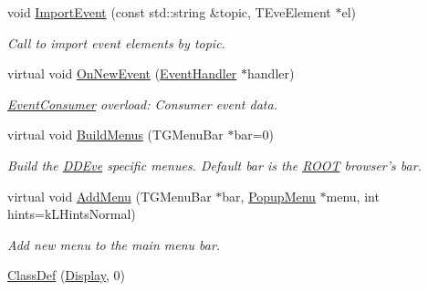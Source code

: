 \begin{DoxyCompactItemize}
void \hyperlink{class_d_d4hep_1_1_display_a4e4468f23cce5076fbd862bc414742c3}{ImportEvent} (const std::string \&topic, TEveElement $\ast$el)
\begin{DoxyCompactList}\small\item\em Call to import event elements by topic. \item\end{DoxyCompactList}\item 
virtual void \hyperlink{class_d_d4hep_1_1_display_a6bde493af2434cc4d59fa8b6b0e58058}{OnNewEvent} (\hyperlink{class_d_d4hep_1_1_event_handler}{EventHandler} $\ast$handler)
\begin{DoxyCompactList}\small\item\em \hyperlink{class_d_d4hep_1_1_event_consumer}{EventConsumer} overload: Consumer event data. \item\end{DoxyCompactList}\item 
virtual void \hyperlink{class_d_d4hep_1_1_display_a9b8dbd9769ea14b3489b481ae3361080}{BuildMenus} (TGMenuBar $\ast$bar=0)
\begin{DoxyCompactList}\small\item\em Build the \hyperlink{struct_d_d4hep_1_1_d_d_eve}{DDEve} specific menues. Default bar is the \hyperlink{namespace_r_o_o_t}{ROOT} browser's bar. \item\end{DoxyCompactList}\item 
virtual void \hyperlink{class_d_d4hep_1_1_display_ac2ef8ca2957cd39ad268c7536edb6757}{AddMenu} (TGMenuBar $\ast$bar, \hyperlink{class_d_d4hep_1_1_popup_menu}{PopupMenu} $\ast$menu, int hints=kLHintsNormal)
\begin{DoxyCompactList}\small\item\em Add new menu to the main menu bar. \item\end{DoxyCompactList}\item 
\hyperlink{class_d_d4hep_1_1_display_a400873f854d08d19a22939eab0bc5b5a}{ClassDef} (\hyperlink{class_d_d4hep_1_1_display}{Display}, 0)
\end{DoxyCompactItemize}
